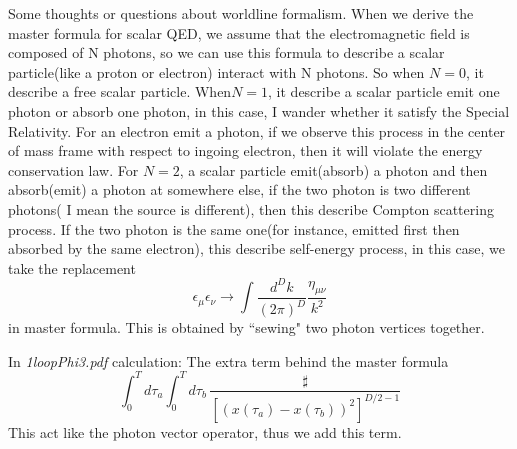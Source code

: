 \begin{description}
Some thoughts or questions about worldline formalism.
When we derive the master formula for scalar QED, we assume that the electromagnetic field is composed of N photons, so we can use this formula to describe a scalar particle(like a proton or electron) interact with N photons. So when $N=0$, it describe a free scalar particle. When$N=1$, it describe a scalar particle emit one photon or absorb one photon, in this case, I wander whether it satisfy the Special Relativity. For an electron emit a photon, if we observe this process in the center of mass frame with respect to ingoing electron, then it will violate the energy conservation law. For $N=2$, a scalar particle emit(absorb) a photon and then absorb(emit) a photon at somewhere else, if the two photon is two different photons( I mean the source is different), then this describe Compton scattering process. If the two photon is the same one(for instance, emitted first then absorbed by the same electron), this describe self-energy process, in this case, we take the replacement
\[
\epsilon_\mu\epsilon_\nu\longrightarrow\int\frac{d^{D}k}{(2\pi)^{D}}\frac{\eta_{\mu\nu}}{k^2}
\]
in master formula. This is obtained by ``sewing" two photon vertices together.


In {\em 1loopPhi3.pdf} calculation: The extra term behind the master formula
\[
\int_0^T \! d\tau_a\int_0^T \! d\tau_b  \,\frac{\sharp}{[(x(\tau_a)-x(\tau_b))^2]^{D/2-1}}
\]
This act like the photon vector operator, thus we add this term.







\end{description}

\printbibliography[heading=subbibintoc,title={References}]


\renewcommand{\ssp}{a}

